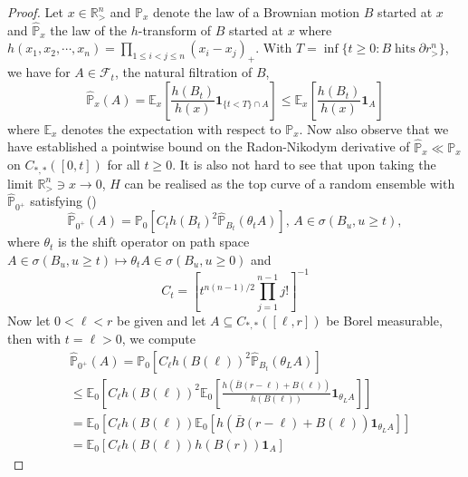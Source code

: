 \documentclass[11pt, reqno]{amsart}
\numberwithin{equation}{section}
\newcommand{\R}{\ensuremath{\mathbb{R}}}
\newcommand{\PP}{\ensuremath{\mathbb{P}}}
\begin{document}
\begin{proof}

Let $x\in \R^n_{>}$ and $ \PP_x$ denote the law of a Brownian motion $B$ started at $x$ and $\hat{\PP}_x$ the law of the $h$-transform of $B$ started at $x$ where $h(x_1, x_2, \cdots, x_n) = \prod_{1\le i < j\le n}(x_i-x_j)_+$. With $T = \inf\{t\ge 0: B\; \text{hits} \; \partial r^n_>\}$, we have for $A\in \mathcal{F}_t$, the natural filtration of $B$, 
\begin{equation*}\label{eq: dyson rn basic estimate}
    \hat{\PP}_x(A) = \mathbb{E}_x\left[\frac{h(B_t)}{h(x)}\mathbf{1}_{\{t<T\}\cap A}\right] \le \mathbb{E}_x\left[\frac{h(B_t)}{h(x)}\mathbf{1}_{A}\right]
\end{equation*}
where $\mathbb{E}_x$ denotes the expectation with respect to $\PP_x$. Now also observe that we have established a pointwise bound on the Radon-Nikodym derivative of $\hat{\PP}_x \ll \PP_x$ on $C_{*,*}([0,t])$ for all $t\ge 0$. It is also not hard to see that upon taking the limit $\R^n_> \ni x \to 0$, $H$ can be realised as the top curve of a random ensemble with $\hat{\PP}_{0^+}$ satisfying (\cite{O2002representation})
\begin{equation*}
    \hat{\PP}_{0^+}(A) = \PP_0 \left[C_t h(B_t)^2 \hat{\PP}_{B_t}(\theta_t A)\right], \, A\in \sigma(B_u, u\ge t),
\end{equation*}
where $\theta_t$ is the shift operator on path space $A\in \sigma(B_u, u\ge t)\mapsto \theta_t A\in \sigma(B_u, u\ge 0)$ and 
\begin{equation*}
    C_t = \left[t^{n(n-1)/2}\prod_{j=1}^{n-1}j!\right]^{-1}
\end{equation*}
Now let $0<\ell<r$ be given and let $A\subseteq C_{*,*}([\ell,r])$ be Borel measurable, then with $t = \ell>0$, we compute
\begin{equation*}
\begin{array}{cc}
     & \hat{\PP}_{0^+}(A) = \PP_0 \left[C_\ell h(B(\ell))^2 \hat{\PP}_{B_t}(\theta_L A)\right]\\
     & \le \mathbb{E}_0\left[C_\ell h(B(\ell))^2 \mathbb{E}_{0}\left[\frac{h(\bar{B}(r-\ell)+B(\ell))}{h(B(\ell))}\mathbf{1}_{\theta_L A}\right]\right] \\
     & = \mathbb{E}_0\left[C_\ell h(B(\ell)) \mathbb{E}_{0}\left[h(\bar{B}(r-\ell)+B(\ell))\mathbf{1}_{\theta_L A}\right]\right] \\
     & = \mathbb{E}_0\left[C_\ell h(B(\ell))h(B(r))\mathbf{1}_{A}\right]
\end{array}
\end{equation*}

\end{proof}
\end{document}
